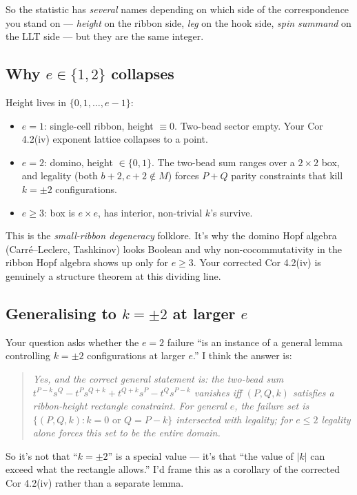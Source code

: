 \documentclass[11pt]{article}
\begin{document}
So the statistic has \emph{several} names depending on which side of the correspondence you stand on --- \emph{height} on the ribbon side, \emph{leg} on the hook side, \emph{spin summand} on the LLT side --- but they are the same integer.

\subsection*{Why $e\in\{1,2\}$ collapses}

Height lives in $\{0, 1, \dots, e-1\}$:
\begin{itemize}[leftmargin=1.5em]
  \item $e = 1$: single-cell ribbon, height $\equiv 0$. Two-bead sector empty. Your Cor 4.2(iv) exponent lattice collapses to a point.
  \item $e = 2$: domino, height $\in \{0,1\}$. The two-bead sum ranges over a $2\times 2$ box, and legality (both $b+2, c+2 \notin M$) forces $P + Q$ parity constraints that kill $k = \pm 2$ configurations.
  \item $e \ge 3$: box is $e \times e$, has interior, non-trivial $k$'s survive.
\end{itemize}
This is the \emph{small-ribbon degeneracy} folklore. It's why the domino Hopf algebra (Carr\'e--Leclerc, Ta\-shki\-nov) looks Boolean and why non-cocommutativity in the ribbon Hopf algebra shows up only for $e \ge 3$. Your corrected Cor 4.2(iv) is genuinely a structure theorem at this dividing line.

\subsection*{Generalising to $k = \pm 2$ at larger $e$}

Your question asks whether the $e=2$ failure ``is an instance of a general lemma controlling $k=\pm 2$ configurations at larger $e$.'' I think the answer is:

\begin{quote}
\emph{Yes, and the correct general statement is: the two-bead sum
$t^{P-k}s^Q - t^P s^{Q+k} + t^{Q+k}s^P - t^Q s^{P-k}$ vanishes iff
$(P,Q,k)$ satisfies a ribbon-height rectangle constraint. For general
$e$, the failure set is $\{(P,Q,k) : k = 0 \text{ or } Q = P-k\}$
intersected with legality; for $e \le 2$ legality alone forces this
set to be the entire domain.}
\end{quote}

So it's not that ``$k = \pm 2$'' is a special value --- it's that ``the value of $|k|$ can exceed what the rectangle allows.'' I'd frame this as a corollary of the corrected Cor 4.2(iv) rather than a separate lemma.
\end{document}
